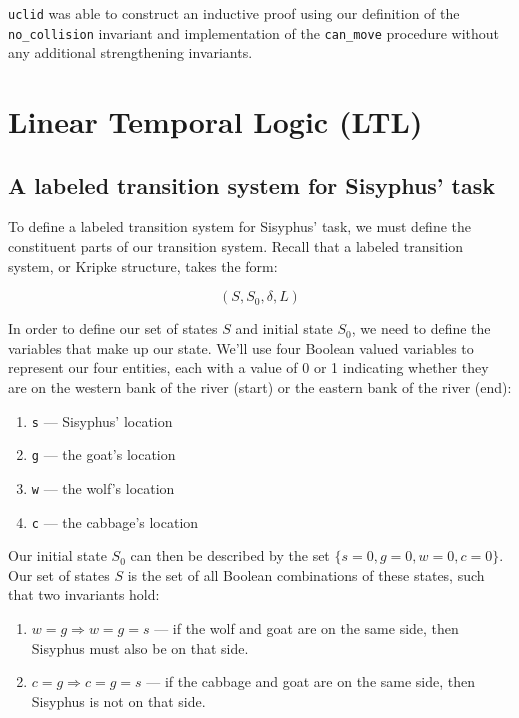 \documentclass{article}
\newcommand{\code}[1]{\texttt{#1}}
\begin{document}
\code{uclid} was able to construct an inductive proof using our definition of the \code{no\_collision} invariant and implementation of the \code{can\_move} procedure without any additional strengthening invariants.

\section{Linear Temporal Logic (LTL)}

\subsection{A labeled transition system for Sisyphus' task}

To define a labeled transition system for Sisyphus' task, we must define the constituent parts of our transition system. Recall that a labeled transition system, or Kripke structure, takes the form:

$$
(S, S_0, \delta, L)
$$

In order to define our set of states $S$ and initial state $S_0$, we need to define the variables that make up our state. We'll use four Boolean valued variables to represent our four entities, each with a value of 0 or 1 indicating whether they are on the western bank of the river (start) or the eastern bank of the river (end):

\begin{enumerate}
  \item \code{s} — Sisyphus' location 
  \item \code{g} — the goat's location
  \item \code{w} — the wolf's location
  \item \code{c} — the cabbage's location
\end{enumerate}

Our initial state $S_0$ can then be described by the set $\{s = 0, g = 0, w = 0, c = 0\}$. Our set of states $S$ is the set of all Boolean combinations of these states, such that two invariants hold: 

\begin{enumerate}
  \item $w = g \Longrightarrow w = g = s$ — if the wolf and goat are on the same side, then Sisyphus must also be on that side.
  \item $c = g \Longrightarrow c = g = s$ — if the cabbage and goat are on the same side, then Sisyphus is not on that side.
\end{enumerate}
\end{document}
